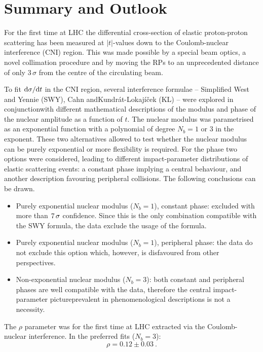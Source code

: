 \section{Summary and Outlook}
\label{sec:summary}
For the first time at LHC the differential cross-section of elastic proton-proton scattering has been measured at $|t|$-values down to the Coulomb-nuclear interference (CNI) region. This was made possible by a special beam optics, a novel collimation procedure and by moving the RPs to an unprecedented distance of only $3\,\sigma$ from the centre of the circulating beam.

To fit ${\rm d}\sigma/{\rm d} t$ in the CNI region, several interference formulae -- Simplified West and Yennie (SWY), Cahn and\Break Kundr\' at-Lokaj\' i\v cek (KL) -- were explored in conjunction\Break with different mathematical descriptions of the modulus and phase of the nuclear amplitude as a function of $t$. The nuclear modulus was parametrised as an exponential function with a polynomial of degree $N_b=1$ or $3$ in the exponent. These two alternatives allowed to test whether the nuclear modulus can be purely exponential or more flexibility is required. For the phase two options were considered, leading to different impact-parameter distributions of elastic scattering events: a constant phase implying a central behaviour, and another description favouring peripheral collisions. The following conclusions can be drawn.
\begin{itemize}
\item Purely exponential nuclear modulus ($N_b=1$), constant phase: excluded with more than $7\,{\rm \sigma}$ confidence. Since this is the only combination compatible with the SWY formula, the data exclude the usage of the formula.
\item Purely exponential nuclear modulus ($N_b=1$), peripheral phase: the data do not exclude this option which, however, is disfavoured from other perspectives.
\item Non-exponential nuclear modulus ($N_b=3$): both constant and peripheral phases are well compatible with the data, therefore the central impact-parameter picture\Break prevalent in phenomenological descriptions is not a necessity.
\end{itemize}

The $\rho$ parameter was for the first time at LHC extracted via the Coulomb-nuclear interference. In the preferred fits ($N_b=3$):
\begin{equation}
\label{eq:rho final}
\rho = 0.12 \pm 0.03\ .
\end{equation}

